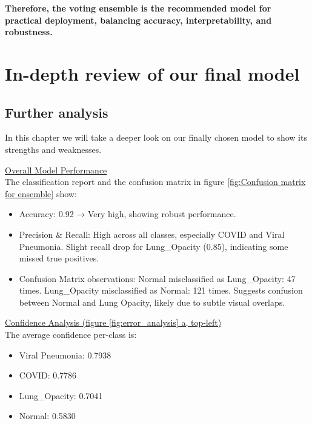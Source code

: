 \documentclass{article}
\begin{document}
\noindent
\textbf{Therefore, the voting ensemble is the recommended model for practical deployment, balancing accuracy, interpretability, and robustness.}


\newpage

\section{In-depth review of our final model}

\subsection{Further analysis}

In this chapter we will take a deeper look on our finally chosen model to show its strengths and weaknesses.

\underline{Overall Model Performance}\\
The classification report and the confusion matrix in figure \ref{fig:Confusion matrix for ensemble} show:
\begin{itemize}
    \item Accuracy: 0.92 → Very high, showing robust performance.
    \item Precision \& Recall: High across all classes, especially COVID and Viral Pneumonia. Slight recall drop for Lung\_Opacity (0.85), indicating some missed true positives.
    \item Confusion Matrix observations: Normal misclassified as Lung\_Opacity: 47 times. Lung\_Opacity misclassified as Normal: 121 times. Suggests confusion between Normal and Lung Opacity, likely due to subtle visual overlaps.
\end{itemize}

\vspace{0.4cm}

\underline{Confidence Analysis (figure \ref{fig:error_analysis} a, top-left)}\\
The average confidence per-class is:
\begin{itemize}
    \item Viral Pneumonia: 0.7938
    \item COVID: 0.7786
    \item Lung\_Opacity: 0.7041
    \item Normal: 0.5830
\end{itemize}
\end{document}

